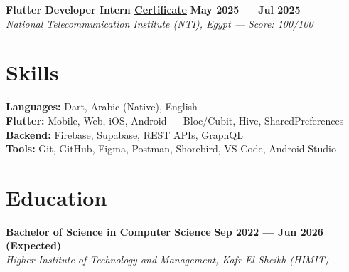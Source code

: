 \documentclass[a4paper,11pt]{article}
\newcommand{\entry}[2]{%
  \textbf{#1} \hfill \textbf{#2}%
}
\begin{document}
\vspace{3pt}
\noindent\entry{Flutter Developer Intern \small\href{https://drive.google.com/file/d/1DiA9E64teOhpFkgzaA5GjxVm2P1-udQ-/view?usp=sharing}{Certificate}}{May 2025 --- Jul 2025}\\[1pt]
\textit{National Telecommunication Institute (NTI), Egypt --- Score: 100/100}
\vspace{4pt}

\section{Skills}

\noindent
\textbf{Languages:} Dart, Arabic (Native), English\\[1.5pt]
\textbf{Flutter:} Mobile, Web, iOS, Android --- Bloc/Cubit, Hive, SharedPreferences\\[1.5pt]
\textbf{Backend:} Firebase, Supabase, REST APIs, GraphQL\\[1.5pt]
\textbf{Tools:} Git, GitHub, Figma, Postman, Shorebird, VS Code, Android Studio

\section{Education}

\noindent\entry{Bachelor of Science in Computer Science}{Sep 2022 --- Jun 2026 (Expected)}\\[1pt]
\textit{Higher Institute of Technology and Management, Kafr El-Sheikh (HIMIT)}
\end{document}
